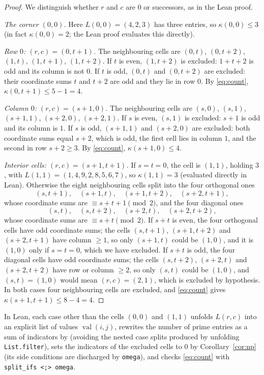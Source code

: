 \documentclass[11pt]{amsart}
\theoremstyle{plain}
\theoremstyle{definition}
\newcommand{\val}{\operatorname{val}}
\begin{document}
\begin{proof}
We distinguish whether $r$ and $c$ are $0$ or successors, as in the Lean proof.

\emph{The corner $(0,0)$.}
Here $L(0,0)=(4,2,3)$ has three entries, so $\kappa(0,0)\le3$ (in fact $\kappa(0,0)=2$; the Lean proof evaluates this directly).

\emph{Row $0$: $(r,c)=(0,t+1)$.}
The neighbouring cells are $(0,t)$, $(0,t+2)$, $(1,t)$, $(1,t+1)$, $(1,t+2)$.
If $t$ is even, $(1,t+2)$ is excluded: $1+t+2$ is odd and its column is not $0$.
If $t$ is odd, $(0,t)$ and $(0,t+2)$ are excluded: their coordinate sums $t$ and $t+2$ are odd and they lie in row $0$.
By \eqref{eq:count}, $\kappa(0,t+1)\le 5-1=4$.

\emph{Column $0$: $(r,c)=(s+1,0)$.}
The neighbouring cells are $(s,0)$, $(s,1)$, $(s+1,1)$, $(s+2,0)$, $(s+2,1)$.
If $s$ is even, $(s,1)$ is excluded: $s+1$ is odd and its column is $1$.
If $s$ is odd, $(s+1,1)$ and $(s+2,0)$ are excluded: both coordinate sums equal $s+2$, which is odd, the first cell lies in column $1$, and the second in row $s+2\ge3$.
By \eqref{eq:count}, $\kappa(s+1,0)\le4$.

\emph{Interior cells: $(r,c)=(s+1,t+1)$.}
If $s=t=0$, the cell is $(1,1)$, holding $3$, with $L(1,1)=(1,4,9,2,8,5,6,7)$, so $\kappa(1,1)=3$ (evaluated directly in Lean).
Otherwise the eight neighbouring cells split into the four orthogonal ones
\[
  (s,t+1),\quad (s+1,t),\quad (s+1,t+2),\quad (s+2,t+1),
\]
whose coordinate sums are $\equiv s+t+1\pmod2$, and the four diagonal ones
\[
  (s,t),\quad (s,t+2),\quad (s+2,t),\quad (s+2,t+2),
\]
whose coordinate sums are $\equiv s+t\pmod2$.
If $s+t$ is even, the four orthogonal cells have odd coordinate sums; the cells $(s,t+1)$, $(s+1,t+2)$ and $(s+2,t+1)$ have column $\ge1$, so only $(s+1,t)$ could be $(1,0)$, and it is $(1,0)$ only if $s=t=0$, which we have excluded.
If $s+t$ is odd, the four diagonal cells have odd coordinate sums; the cells $(s,t+2)$, $(s+2,t)$ and $(s+2,t+2)$ have row or column $\ge2$, so only $(s,t)$ could be $(1,0)$, and $(s,t)=(1,0)$ would mean $(r,c)=(2,1)$, which is excluded by hypothesis.
In both cases four neighbouring cells are excluded, and \eqref{eq:count} gives $\kappa(s+1,t+1)\le8-4=4$.
\end{proof}

In Lean, each case other than the cells $(0,0)$ and $(1,1)$ unfolds $L(r,c)$ into an explicit list of values $\val(i,j)$, rewrites the number of prime entries as a sum of indicators by  (avoiding the nested case splits produced by unfolding \texttt{List.filter}), sets the indicators of the excluded cells to $0$ by Corollary~\ref{cor:np} (its side conditions are discharged by \texttt{omega}), and checks \eqref{eq:count} with \texttt{split\_ifs <;> omega}.
\end{document}
